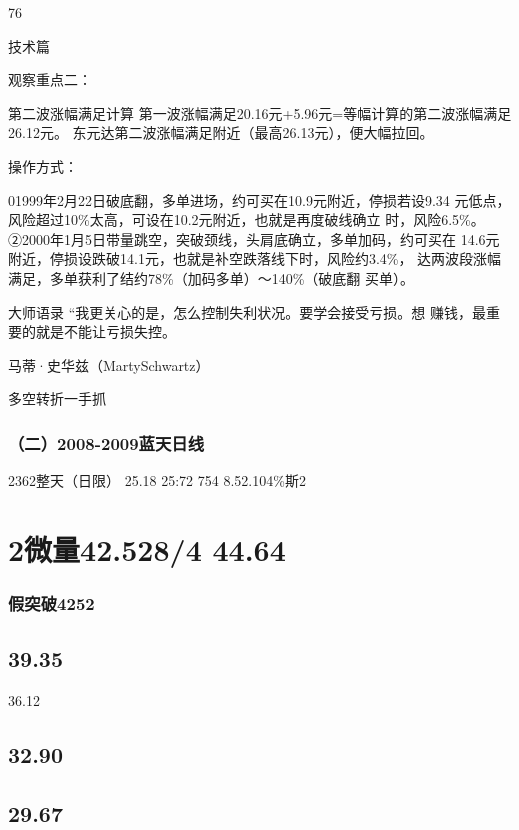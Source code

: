 \documentclass{article}
\begin{document}
76

\clearpage

技术篇

观察重点二：

第二波涨幅满足计算 第一波涨幅满足20.16元+5.96元=等幅计算的第二波涨幅满足26.12元。 东元达第二波涨幅满足附近（最高26.13元），便大幅拉回。

操作方式：

01999年2月22日破底翻，多单进场，约可买在10.9元附近，停损若设9.34 元低点，风险超过10\%太高，可设在10.2元附近，也就是再度破线确立 时，风险6.5\%。 ②2000年1月5日带量跳空，突破颈线，头肩底确立，多单加码，约可买在 14.6元附近，停损设跌破14.1元，也就是补空跌落线下时，风险约3.4\%， 达两波段涨幅满足，多单获利了结约78\%（加码多单）～140\%（破底翻 买单）。

大师语录 “我更关心的是，怎么控制失利状况。要学会接受亏损。想 赚钱，最重要的就是不能让亏损失控。

马蒂·史华兹（MartySchwartz）

\clearpage

多空转折一手抓

\subsubsection{（二）2008-2009蓝天日线}

2362整天（日限） 25.18 25:72 754 8.52.104\%斯2

\section{2微量42.528/4 44.64}

\subsubsection{假突破4252}

\subsection{39.35}

36.12

\subsection{32.90}

\subsection{29.67}
\end{document}
